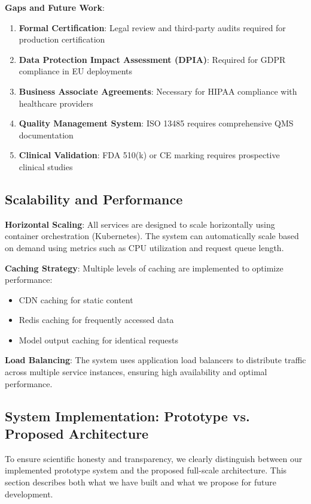 \documentclass[12pt,a4paper]{article}
\begin{document}
\textbf{Gaps and Future Work}:
\begin{enumerate}
    \item \textbf{Formal Certification}: Legal review and third-party audits required for production certification
    \item \textbf{Data Protection Impact Assessment (DPIA)}: Required for GDPR compliance in EU deployments
    \item \textbf{Business Associate Agreements}: Necessary for HIPAA compliance with healthcare providers
    \item \textbf{Quality Management System}: ISO 13485 requires comprehensive QMS documentation
    \item \textbf{Clinical Validation}: FDA 510(k) or CE marking requires prospective clinical studies
\end{enumerate}

\subsection{Scalability and Performance}

\textbf{Horizontal Scaling}: All services are designed to scale horizontally using container orchestration (Kubernetes). The system can automatically scale based on demand using metrics such as CPU utilization and request queue length.

\textbf{Caching Strategy}: Multiple levels of caching are implemented to optimize performance:
\begin{itemize}
    \item CDN caching for static content
    \item Redis caching for frequently accessed data
    \item Model output caching for identical requests
\end{itemize}

\textbf{Load Balancing}: The system uses application load balancers to distribute traffic across multiple service instances, ensuring high availability and optimal performance.

\subsection{System Implementation: Prototype vs. Proposed Architecture}

To ensure scientific honesty and transparency, we clearly distinguish between our implemented prototype system and the proposed full-scale architecture. This section describes both what we have built and what we propose for future development.
\end{document}
